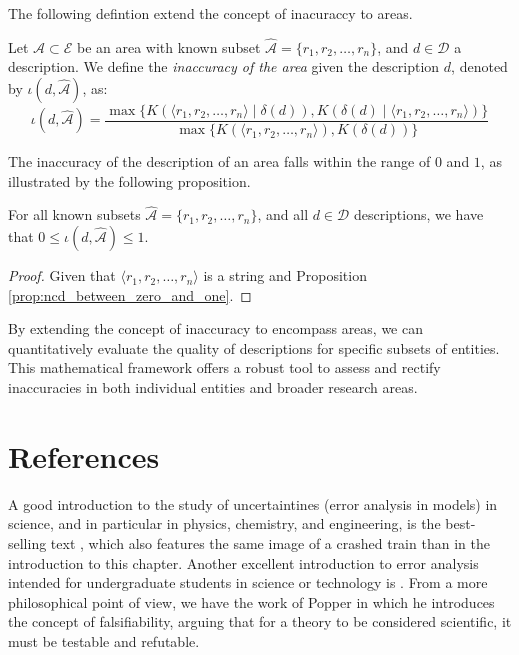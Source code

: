 The following defintion extend the concept of inacuraccy to areas.

\begin{definition}
Let $\mathcal{A} \subset \mathcal{E}$ be an area with known subset $\hat{\mathcal{A}} = \{r_1, r_2, \ldots, r_n\}$, and $d \in \mathcal{D}$ a description. We define the \emph{inaccuracy of the area} given the description $d$, denoted by $\iota(d, \hat{\mathcal{A}})$, as:
\[
\iota(d, \hat{\mathcal{A}}) = \frac{ \max\{ K \left( \langle r_1, r_2, \ldots, r_n \rangle \mid \delta(d) \right), K \left( \delta(d) \mid \langle r_1, r_2, \ldots, r_n \rangle \right) \} } { \max\{ K(\langle r_1, r_2, \ldots, r_n \rangle), K \left(\delta(d) \right) \} }
\]
\end{definition}

The inaccuracy of the description of an area falls within the range of $0$ and $1$, as illustrated by the following proposition.

\begin{proposition}
\label{prop:inaccuracy:inaccuracy:range}
For all known subsets $\hat{\mathcal{A}} = \{r_1, r_2, \ldots, r_n\}$, and all $d \in \mathcal{D}$ descriptions, we have that $0 \leq \iota(d, \hat{\mathcal{A}}) \leq 1$.
\end{proposition}
\begin{proof}
Given that $\langle r_1, r_2, \ldots, r_n \rangle$ is a string and Proposition \ref{prop:ncd_between_zero_and_one}.
\end{proof}

By extending the concept of inaccuracy to encompass areas, we can quantitatively evaluate the quality of descriptions for specific subsets of entities. This mathematical framework offers a robust tool to assess and rectify inaccuracies in both individual entities and broader research areas.

%
%

\section*{References}

A good introduction to the study of uncertaintines (error analysis in models) in science, and in particular in physics, chemistry, and engineering, is the best-selling text \cite{taylor2022introduction}, which also features the same image of a crashed train than in the introduction to this chapter. Another excellent introduction to error analysis intended for undergraduate students in science or technology is \cite{hughes2010measurements}. From a more philosophical point of view, we have the work of Popper \cite{popper2014conjectures} in which he introduces the concept of falsifiability, arguing that for a theory to be considered scientific, it must be testable and refutable.



